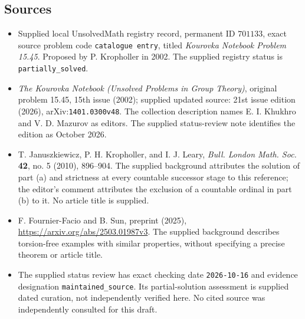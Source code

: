 \documentclass[11pt]{article}
\begin{document}
\subsection{Sources}
\begin{itemize}
\item Supplied local UnsolvedMath registry record, permanent ID \(701133\), exact source problem code \texttt{catalogue entry}, titled \emph{Kourovka Notebook Problem 15.45}. Proposed by P. Kropholler in 2002. The supplied registry status is \texttt{partially\_solved}.
\item \emph{The Kourovka Notebook (Unsolved Problems in Group Theory)}, original problem 15.45, 15th issue (2002); supplied updated source: 21st issue edition (2026), arXiv:\texttt{1401.0300v48}. The collection description names E. I. Khukhro and V. D. Mazurov as editors. The supplied status-review note identifies the edition as October 2026.
\item T. Januszkiewicz, P. H. Kropholler, and I. J. Leary, \emph{Bull. London Math. Soc.} \textbf{42}, no. 5 (2010), 896--904. The supplied background attributes the solution of part (a) and strictness at every countable successor stage to this reference; the editor's comment attributes the exclusion of a countable ordinal in part (b) to it. No article title is supplied.
\item F. Fournier-Facio and B. Sun, preprint (2025), \url{https://arxiv.org/abs/2503.01987v3}. The supplied background describes torsion-free examples with similar properties, without specifying a precise theorem or article title.
\item The supplied status review has exact checking date \texttt{2026-10-16} and evidence designation \texttt{maintained\_source}. Its partial-solution assessment is supplied dated curation, not independently verified here. No cited source was independently consulted for this draft.
\end{itemize}
\end{document}
